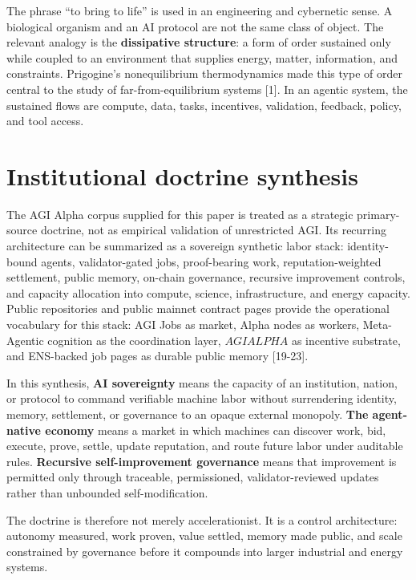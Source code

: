 The phrase ``to bring to life'' is used in an engineering and cybernetic
sense. A biological organism and an AI protocol are not the same class
of object. The relevant analogy is the \textbf{dissipative structure}: a
form of order sustained only while coupled to an environment that
supplies energy, matter, information, and constraints. Prigogine's
nonequilibrium thermodynamics made this type of order central to the
study of far-from-equilibrium systems {[}1{]}. In an agentic system, the
sustained flows are compute, data, tasks, incentives, validation,
feedback, policy, and tool access.

\section{Institutional doctrine
synthesis}\label{institutional-doctrine-synthesis}

The AGI Alpha corpus supplied for this paper is treated as a strategic
primary-source doctrine, not as empirical validation of unrestricted
AGI. Its recurring architecture can be summarized as a sovereign
synthetic labor stack: identity-bound agents, validator-gated jobs,
proof-bearing work, reputation-weighted settlement, public memory,
on-chain governance, recursive improvement controls, and capacity
allocation into compute, science, infrastructure, and energy capacity.
Public repositories and public mainnet contract pages provide the
operational vocabulary for this stack: AGI Jobs as market, Alpha nodes
as workers, Meta-Agentic cognition as the coordination layer,
\(AGIALPHA\) as incentive substrate, and ENS-backed job pages as durable
public memory {[}19-23{]}.

In this synthesis, \textbf{AI sovereignty} means the capacity of an
institution, nation, or protocol to command verifiable machine labor
without surrendering identity, memory, settlement, or governance to an
opaque external monopoly. \textbf{The agent-native economy} means a
market in which machines can discover work, bid, execute, prove, settle,
update reputation, and route future labor under auditable rules.
\textbf{Recursive self-improvement governance} means that improvement is
permitted only through traceable, permissioned, validator-reviewed
updates rather than unbounded self-modification.

The doctrine is therefore not merely accelerationist. It is a control
architecture: autonomy measured, work proven, value settled, memory made
public, and scale constrained by governance before it compounds into
larger industrial and energy systems.

